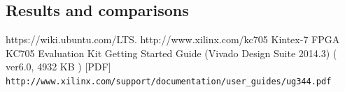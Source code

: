 \documentclass[twopage,12pt,a4paper]{report}
\begin{document}
\begin{raggedright}
\chapter{Results and comparisons}

 \begin{thebibliography}{9}
 https://wiki.ubuntu.com/LTS.
 http://www.xilinx.com/kc705 
 Kintex-7 FPGA KC705 Evaluation Kit Getting Started Guide (Vivado Design Suite 2014.3) ( ver6.0, 4932 KB ) [PDF]
\verb| http://www.xilinx.com/support/documentation/user_guides/ug344.pdf |
\end{thebibliography}




\end{raggedright}                                                                                                                   
\end{document}
